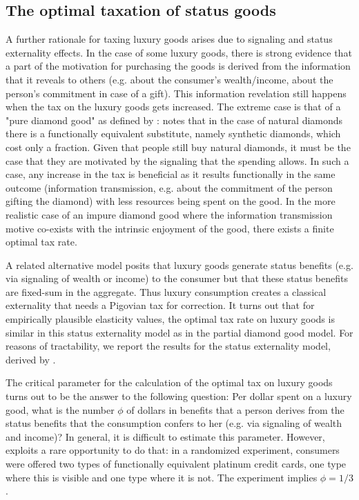 \documentclass[../../main]{subfiles}
\begin{document}
\subsection{The optimal taxation of status goods}

A further rationale for taxing luxury goods arises due to signaling and status externality effects. In the case of some luxury goods, there is strong evidence that a part of the motivation for purchasing the goods is derived from the information that it reveals to others (e.g. about the consumer's wealth/income, about the person's commitment in case of a gift). This information revelation still happens when the tax on the luxury goods gets increased. The extreme case is that of a "pure diamond good" as defined by  \citet{ng1987diamonds}:  \citet{ng1987diamonds} notes that in the case of natural diamonds there is a functionally equivalent substitute, namely synthetic diamonds, which cost only a fraction. Given that people still buy natural diamonds, it must be the case that they are motivated by the signaling that the spending allows. In such a case, any increase in the tax is beneficial as it results functionally in the same outcome (information transmission, e.g. about the commitment of the person gifting the diamond) with less resources being spent on the good. In the more realistic case of an impure diamond good where the information transmission motive co-exists with the intrinsic enjoyment of the good, there exists a finite optimal tax rate.

A related alternative model posits that luxury goods generate status benefits (e.g. via signaling of wealth or income) to the consumer but that these status benefits are fixed-sum in the aggregate. Thus luxury consumption creates a classical externality that needs a Pigovian tax for correction. It turns out that for empirically plausible elasticity values, the optimal tax rate on luxury goods is similar in this status externality model as in the partial diamond good model. For reasons of tractability, we report the results for the status externality model, derived by \citet{Xie2026}. 

The critical parameter for the calculation of the optimal tax on luxury goods turns out to be the answer to the following question: Per dollar spent on a luxury good, what is the number $\phi$ of dollars in benefits that a person derives from the status benefits that the consumption confers to her (e.g. via signaling of wealth and income)? In general, it is difficult to estimate this parameter. However, \cite{bursztyn2018status} exploits a rare opportunity to do that: in a randomized experiment, consumers were offered two types of functionally equivalent platinum credit cards, one type where this is visible and one type where it is not.  The experiment implies $\phi=1/3$.
\end{document}
